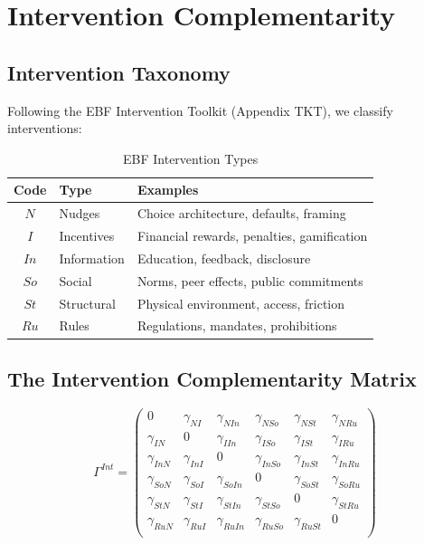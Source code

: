\section{Intervention Complementarity}
\label{sec:intervention}

\subsection{Intervention Taxonomy}

Following the EBF Intervention Toolkit (Appendix TKT), we classify interventions:

\begin{table}[h]
\centering
\caption{EBF Intervention Types}
\label{tab:intervention-types}
\renewcommand{\arraystretch}{1.3}
\begin{tabular}{@{}clp{5.5cm}@{}}
\toprule
\textbf{Code} & \textbf{Type} & \textbf{Examples} \\
\midrule
$N$ & Nudges & Choice architecture, defaults, framing \\
$I$ & Incentives & Financial rewards, penalties, gamification \\
$In$ & Information & Education, feedback, disclosure \\
$So$ & Social & Norms, peer effects, public commitments \\
$St$ & Structural & Physical environment, access, friction \\
$Ru$ & Rules & Regulations, mandates, prohibitions \\
\bottomrule
\end{tabular}
\end{table}

\subsection{The Intervention Complementarity Matrix}

\begin{definition}
\begin{equation}
\Gamma^{Int} = \begin{pmatrix}
0 & \gamma_{NI} & \gamma_{NIn} & \gamma_{NSo} & \gamma_{NSt} & \gamma_{NRu} \\
\gamma_{IN} & 0 & \gamma_{IIn} & \gamma_{ISo} & \gamma_{ISt} & \gamma_{IRu} \\
\gamma_{InN} & \gamma_{InI} & 0 & \gamma_{InSo} & \gamma_{InSt} & \gamma_{InRu} \\
\gamma_{SoN} & \gamma_{SoI} & \gamma_{SoIn} & 0 & \gamma_{SoSt} & \gamma_{SoRu} \\
\gamma_{StN} & \gamma_{StI} & \gamma_{StIn} & \gamma_{StSo} & 0 & \gamma_{StRu} \\
\gamma_{RuN} & \gamma_{RuI} & \gamma_{RuIn} & \gamma_{RuSo} & \gamma_{RuSt} & 0 \\
\end{pmatrix}
\end{equation}
\end{definition}

